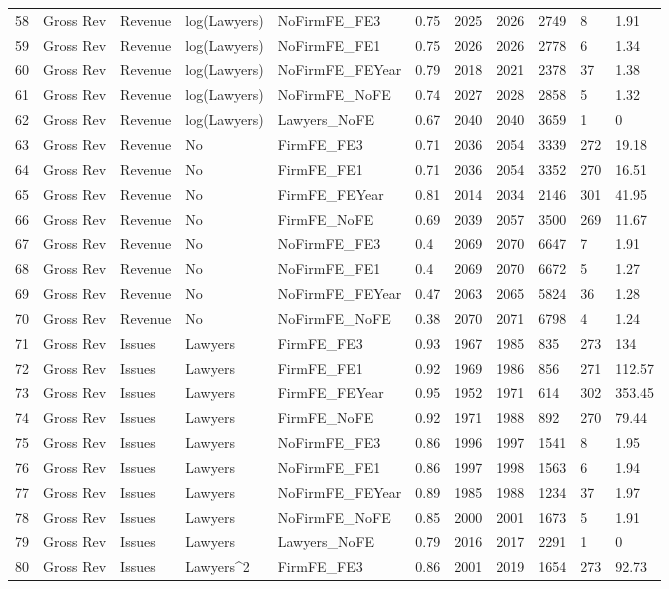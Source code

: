\documentclass{article}
\begin{document}
\begin{table}[H]
\begin{tabular}{rllllllllll}
  58 & Gross Rev & Revenue & log(Lawyers) & NoFirmFE\_FE3 & 0.75 & 2025 & 2026 & 2749 & 8 & 1.91 \\ 
  59 & Gross Rev & Revenue & log(Lawyers) & NoFirmFE\_FE1 & 0.75 & 2026 & 2026 & 2778 & 6 & 1.34 \\ 
  60 & Gross Rev & Revenue & log(Lawyers) & NoFirmFE\_FEYear & 0.79 & 2018 & 2021 & 2378 & 37 & 1.38 \\ 
  61 & Gross Rev & Revenue & log(Lawyers) & NoFirmFE\_NoFE & 0.74 & 2027 & 2028 & 2858 & 5 & 1.32 \\ 
  62 & Gross Rev & Revenue & log(Lawyers) & Lawyers\_NoFE & 0.67 & 2040 & 2040 & 3659 & 1 & 0 \\ 
  63 & Gross Rev & Revenue & No & FirmFE\_FE3 & 0.71 & 2036 & 2054 & 3339 & 272 & 19.18 \\ 
  64 & Gross Rev & Revenue & No & FirmFE\_FE1 & 0.71 & 2036 & 2054 & 3352 & 270 & 16.51 \\ 
  65 & Gross Rev & Revenue & No & FirmFE\_FEYear & 0.81 & 2014 & 2034 & 2146 & 301 & 41.95 \\ 
  66 & Gross Rev & Revenue & No & FirmFE\_NoFE & 0.69 & 2039 & 2057 & 3500 & 269 & 11.67 \\ 
  67 & Gross Rev & Revenue & No & NoFirmFE\_FE3 & 0.4 & 2069 & 2070 & 6647 & 7 & 1.91 \\ 
  68 & Gross Rev & Revenue & No & NoFirmFE\_FE1 & 0.4 & 2069 & 2070 & 6672 & 5 & 1.27 \\ 
  69 & Gross Rev & Revenue & No & NoFirmFE\_FEYear & 0.47 & 2063 & 2065 & 5824 & 36 & 1.28 \\ 
  70 & Gross Rev & Revenue & No & NoFirmFE\_NoFE & 0.38 & 2070 & 2071 & 6798 & 4 & 1.24 \\ 
  71 & Gross Rev & Issues & Lawyers & FirmFE\_FE3 & 0.93 & 1967 & 1985 & 835 & 273 & 134 \\ 
  72 & Gross Rev & Issues & Lawyers & FirmFE\_FE1 & 0.92 & 1969 & 1986 & 856 & 271 & 112.57 \\ 
  73 & Gross Rev & Issues & Lawyers & FirmFE\_FEYear & 0.95 & 1952 & 1971 & 614 & 302 & 353.45 \\ 
  74 & Gross Rev & Issues & Lawyers & FirmFE\_NoFE & 0.92 & 1971 & 1988 & 892 & 270 & 79.44 \\ 
  75 & Gross Rev & Issues & Lawyers & NoFirmFE\_FE3 & 0.86 & 1996 & 1997 & 1541 & 8 & 1.95 \\ 
  76 & Gross Rev & Issues & Lawyers & NoFirmFE\_FE1 & 0.86 & 1997 & 1998 & 1563 & 6 & 1.94 \\ 
  77 & Gross Rev & Issues & Lawyers & NoFirmFE\_FEYear & 0.89 & 1985 & 1988 & 1234 & 37 & 1.97 \\ 
  78 & Gross Rev & Issues & Lawyers & NoFirmFE\_NoFE & 0.85 & 2000 & 2001 & 1673 & 5 & 1.91 \\ 
  79 & Gross Rev & Issues & Lawyers & Lawyers\_NoFE & 0.79 & 2016 & 2017 & 2291 & 1 & 0 \\ 
  80 & Gross Rev & Issues & Lawyers^2 & FirmFE\_FE3 & 0.86 & 2001 & 2019 & 1654 & 273 & 92.73 \\ 
   \hline
\end{tabular}
\end{table}
\end{document}
